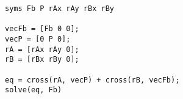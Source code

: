 \begin{verbatim}
syms Fb P rAx rAy rBx rBy

vecFb = [Fb 0 0];
vecP = [0 P 0];
rA = [rAx rAy 0];
rB = [rBx rBy 0];

eq = cross(rA, vecP) + cross(rB, vecFb);
solve(eq, Fb)
\end{verbatim}